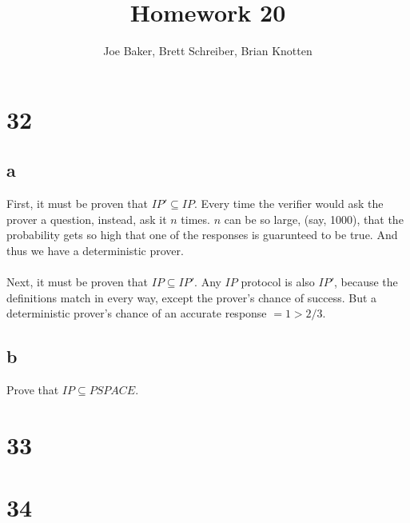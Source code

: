 \documentclass[letterpaper,notitlepage,twoside]{article}
\begin{document}
\title{Homework 20}
\author{Joe Baker, Brett Schreiber, Brian Knotten}
\maketitle

\section*{32}
\subsection*{a}
First, it must be proven that $IP' \subseteq IP$.
Every time the verifier would ask the prover a question, instead, ask it $n$ times. $n$ can be so large, (say, 1000), that the
probability gets so high that one of the responses is guarunteed to be true. And thus we have a deterministic prover. \\\\

Next, it must be proven that $IP \subseteq IP'$.
Any $IP$ protocol is also $IP'$, because the definitions match in every way, except the prover's chance of success.
But a deterministic prover's chance of an accurate response $= 1 > 2/3$.
\subsection*{b}
Prove that $IP \subseteq PSPACE$.

\section*{33}

\section*{34}
\end{document}
